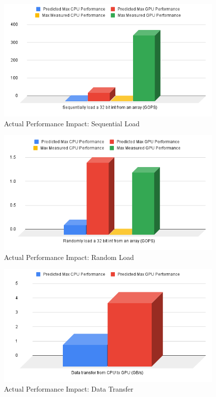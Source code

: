 \documentclass{article}
\begin{document}
\begin{figure}[h!t]
  \centering \includegraphics[width=1\textwidth]{sequential.png}
  \caption{Actual Performance Impact: Sequential Load}
  \label{fig:sequential}
\end{figure}

\begin{figure}[h!t]
  \centering \includegraphics[width=1\textwidth]{random.png}
  \caption{Actual Performance Impact: Random Load}
  \label{fig:random}
\end{figure}

\begin{figure}[h!t]
  \centering \includegraphics[width=1\textwidth]{dataTransfer.png}
  \caption{Actual Performance Impact: Data Transfer}
  \label{fig:transfer}
\end{figure}
\end{document}
